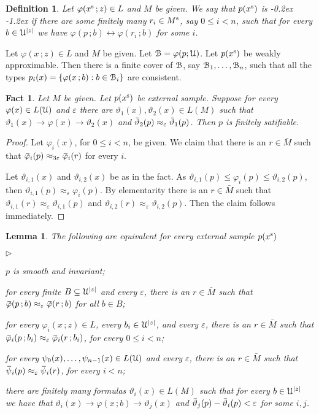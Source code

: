 \documentclass[10pt,openany]{article}
\newcommand{\mylabel}[1]{{\ssf{#1}}\hfill}
\renewenvironment{itemize}
  {\begin{list}{$\triangleright$}{%
   \setlength{\parskip}{0mm}
   \setlength{\topsep}{.4\baselineskip}
   \setlength{\rightmargin}{0mm}
   \setlength{\listparindent}{0mm}
   \setlength{\itemindent}{0mm}
   \setlength{\labelwidth}{3ex}
   \setlength{\itemsep}{.4\baselineskip}
   \setlength{\parsep}{0mm}
   \setlength{\partopsep}{0mm}
   \setlength{\labelsep}{1ex}
   \setlength{\leftmargin}{\labelwidth+\labelsep}
   \let\makelabel\mylabel}}{%
   \end{list}\vspace*{-\parskip}
  }
\newcommand{\sbar}[1]{\mkern 3mu\overline{\mkern-3mu#1\mkern-1mu}\mkern 1mu}
\def\imp{\rightarrow}
\def\iff{\leftrightarrow}
\def\U{\EuScript U}
\def\B{\EuScript B}
\def\theta{\vartheta}
\def\phi{\varphi}
\def\epsilon{\varepsilon}
\def\ssf#1{\textsf{\small #1}}
\newcounter{thm}[section]
\theoremstyle{mio}
\newtheorem{lemma}[thm]{Lemma}
\newtheorem{fact}[thm]{Fact}
\newtheorem{definition}[thm]{Definition}
\theoremstyle{liscio}
\def\QED{\noindent\nolinebreak[4]\hspace{\stretch{1}}\rlap{\ \ $\Box$}\medskip}
\renewcommand*{\emph}[1]{%
   \kern-0.2ex 
   \smash{\tikz[baseline]
   \node[ rectangle, fill=emphcolor, rounded corners, 
          inner xsep=.3ex, inner ysep=.2ex, anchor=base,
          minimum height = 3ex
         ]{#1};
   }
   \kern-1.2ex 
}
\begin{document}
\begin{definition}
  Let $\phi(x^{\rm s}\,;z)\in L$ and $M$ be given.
  We say that $p(x^{\rm s})$ is \emph{weakly approximable\/} if there are some finitely many $r_i\in M^{\rm s}$, say $0\le i<n$, such that for every $b\in\U^{|z|}$ we have $\phi(p\,;b)\iff\phi(r_i\,;b)$ for some $i$.\QED
\end{definition}

Let $\phi(x\,;z)\in L$ and $M$ be given.
%
Let $\B=\phi(p;\U)$.
%
Let $p(x^{\rm s})$ be weakly approximable. Then there is a finite cover of $\B$, say $\B_1,\dots,\B_n$, such that all the types $p_i(x)=\{\phi(x\,;b):b\in\B_i\}$ are consistent.


\begin{fact}
  Let $M$ be given.
  Let $p(x^{\rm s})$ be external sample.
  Suppose for every $\phi(x)\in L(\U)$ and $\epsilon$ there are $\theta_1(x), \theta_2(x)\in L(M)$ such that $\theta_1(x)\imp\phi(x)\imp\theta_2(x)$ and $\sbar\theta_2(p)\approx_\epsilon\sbar\theta_1(p)$.
  Then $p$ is finitely satifiable.
\end{fact}

\begin{proof}
  Let $\phi_i(x)$, for $0\le i<n$, be given.
  We claim that there is an $r\in \bar M$ such that $\sbar\phi_i(p)\approx_{3\epsilon}\sbar\phi_i(r)$ for every $i$.

  Let $\theta_{i,1}(x)$ and $\theta_{i,2}(x)$ be as in the fact.
  As $\theta_{i,1}(p)\le\phi_i(p)\le\theta_{i,2}(p)$, then $\theta_{i,1}(p)\approx_\epsilon\phi_i(p)$.
  By elementarity there is an $r\in \bar M$ such that $\theta_{i,1}(r)\approx_\epsilon\theta_{i,1}(p)$ and $\theta_{i,2}(r)\approx_\epsilon\theta_{i,2}(p)$.
  Then the claim follows immediately.
\end{proof}





\begin{lemma}
  The following are equivalent for every external sample $p(x^{\rm s})$
  \begin{itemize}
    \item[1.] $p$ is smooth and invariant;
    \item[2.] for every finite $B\subseteq\U^{|z|}$ and every $\epsilon$, there is an $r\in \bar M$ such that $\sbar\phi(p\,;b)\approx_\epsilon\sbar\phi(r\,;b)$ for all $b\in B$;
    \item[2.] for every $\phi_i(x\,;z)\in L$, every $b_i\in\U^{|z|}$, and every $\epsilon$, there is an $r\in \bar M$ such that $\sbar\phi_i(p\,;b_i)\approx_\epsilon\sbar\phi_i(r\,;b_i)$, for every $0\le i<n$;
    \item[2.] for every $\psi_0(x),\dots,\psi_{n-1}(x)\in L(\U)$ and every $\epsilon$, there is an $r\in \bar M$ such that $\sbar\psi_i(p)\approx_\epsilon\sbar\psi_i(r)$, for every $i<n$;
    \item[4.] there are finitely many formulas $\theta_i(x)\in L(M)$ such that for every $b\in\U^{|z|}$ we have that $\theta_i(x)\imp\phi(x\,;b)\imp\theta_j(x)$ and $\sbar\theta_j(p)-\sbar\theta_i(p)<\epsilon$ for some $i,j$.
  \end{itemize}
\end{lemma}
\end{document}
